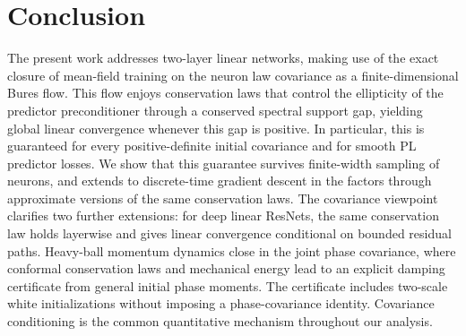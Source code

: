 \section{Conclusion}
The present work addresses two-layer linear networks, making use of the exact closure of mean-field training on the neuron law covariance as a finite-dimensional Bures flow.
This flow enjoys conservation laws that control the ellipticity of the predictor preconditioner through a conserved spectral support gap, yielding global linear convergence whenever this gap is positive.
In particular, this is guaranteed for every positive-definite initial covariance and for smooth PL predictor losses.
We show that this guarantee survives finite-width sampling of neurons, and extends to discrete-time gradient descent in the factors through approximate versions of the same conservation laws.
The covariance viewpoint clarifies two further extensions: for deep linear ResNets, the same conservation law holds layerwise and gives linear convergence conditional on bounded residual paths.
Heavy-ball momentum dynamics close in the joint phase covariance, where conformal conservation laws and mechanical energy lead to an explicit damping certificate from general initial phase moments.
The certificate includes two-scale white initializations without imposing a phase-covariance identity. Covariance conditioning is the common quantitative mechanism throughout our analysis.

